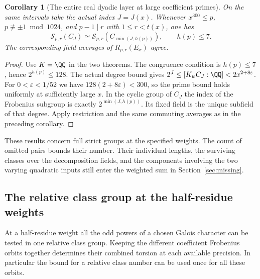 \documentclass[a4paper,11pt]{article}
\newtheorem{corollary}[proposition]{Corollary}
\theoremstyle{definition}
\theoremstyle{remark}
\numberwithin{equation}{section}
\begin{document}
\begin{corollary}[The entire real dyadic layer at large coefficient primes]
\leavevmode\label{cor:realhighprime642}
On the same intervals take the actual index \(J=J(x)\).
Whenever \(x^{300}\le p\), \(p\not\equiv\pm1\bmod1024\), and
\(p-1\mid r\) with \(1\le r<t(x)\), one has
\[
       \mathcal S_{p,r}(C_J)
             \simeq \mathcal S_{p,r}(C_{\min(J,h(p))}),
                       \qquad h(p)\le7 .
\]
The corresponding field averages of \(R_{p,r}(E_x)\) agree.
\end{corollary}
\begin{proof}
Use \(K=\QQ\) in the two theorems. The congruence condition
is \(h(p)\le7\), hence \(2^{h(p)}\le128\). The actual
degree bound gives \(2^J\le[K_\psi C_J:\QQ]<2x^{2+8\varepsilon}\).
For \(0<\varepsilon<1/52\) we have
\(128(2+8\varepsilon)<300\), so the prime bound holds uniformly
at sufficiently large \(x\). In the cyclic group of \(C_J\)
the index of the Frobenius subgroup is exactly
\(2^{\min(J,h(p))}\). Its fixed field is the unique subfield
of that degree. Apply restriction and the same commuting
averages as in the preceding corollary.
\end{proof}

These results concern full strict groups at the specified weights.
The count of omitted pairs bounds their number. Their individual
lengths, the surviving classes over the decomposition fields,
and the components involving the two varying quadratic inputs
still enter the weighted sum in Section~\ref{sec:missing}.


\subsection{The relative class group at the half-residue weights}
\label{sec:relativealldigits643}

At a half-residue weight all the odd powers of a chosen Galois
character can be tested in one relative class group. Keeping
the different coefficient Frobenius orbits together determines
their combined torsion at each available precision. In particular
the bound for a relative class number can be used once for all
these orbits.
\end{document}
